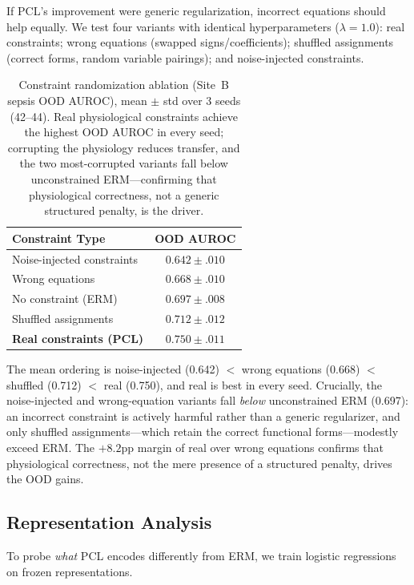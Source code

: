 \documentclass{article}
\begin{document}
If PCL's improvement were generic regularization, incorrect equations should help equally. We test four variants with identical hyperparameters ($\lambda{=}1.0$): real constraints; wrong equations (swapped signs/coefficients); shuffled assignments (correct forms, random variable pairings); and noise-injected constraints.

\begin{table}[htbp]
\caption{Constraint randomization ablation (Site~B sepsis OOD AUROC), mean $\pm$ std over 3 seeds (42--44). Real physiological constraints achieve the highest OOD AUROC in every seed; corrupting the physiology reduces transfer, and the two most-corrupted variants fall below unconstrained ERM---confirming that physiological correctness, not a generic structured penalty, is the driver.}
\label{tab:randomization}
\centering
\small
\begin{tabular}{@{}lc@{}}
\toprule
Constraint Type & OOD AUROC \\
\midrule
Noise-injected constraints & $0.642{\pm}.010$ \\
Wrong equations & $0.668{\pm}.010$ \\
No constraint (ERM) & $0.697{\pm}.008$ \\
Shuffled assignments & $0.712{\pm}.012$ \\
\textbf{Real constraints (PCL)} & $\mathbf{0.750{\pm}.011}$ \\
\bottomrule
\end{tabular}
\end{table}

The mean ordering is noise-injected (0.642) $<$ wrong equations (0.668) $<$ shuffled (0.712) $<$ real (0.750), and real is best in every seed.
Crucially, the noise-injected and wrong-equation variants fall \emph{below} unconstrained ERM (0.697): an incorrect constraint is actively harmful rather than a generic regularizer, and only shuffled assignments---which retain the correct functional forms---modestly exceed ERM.
The $+8.2$pp margin of real over wrong equations confirms that physiological correctness, not the mere presence of a structured penalty, drives the OOD gains.

\subsection{Representation Analysis}
\label{sec:exp4}

To probe \emph{what} PCL encodes differently from ERM, we train logistic regressions on frozen representations.
\end{document}
